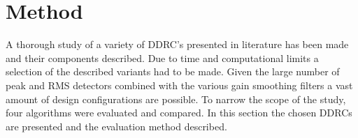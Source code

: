 \documentclass[../main2.tex]{subfiles}
\providecommand{\rootdir}{..}
\begin{document}
\section{Method}\label{method}
A thorough study of a variety of DDRC's presented in literature has been made and their components described. Due to time and computational limits a selection of the described variants had to be made. Given the large number of peak and RMS detectors combined with the various gain smoothing filters a vast amount of design configurations are possible. To narrow the scope of the study, four algorithms were evaluated and compared. In this section the chosen DDRCs are presented and the evaluation method described.








\end{document}
